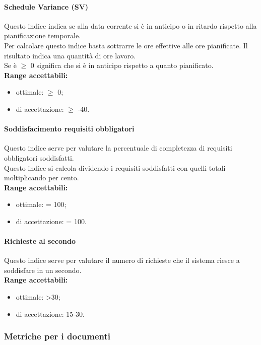 \documentclass{scalatekids-article}
\begin{document}
\paragraph{Schedule Variance (SV)}
Questo indice indica se alla data corrente si è in anticipo o in ritardo rispetto alla pianificazione temporale.\\ Per calcolare questo indice basta sottrarre le ore effettive alle ore pianificate. Il risultato indica una quantità di ore lavoro.\\
Se  è $\geq$ 0 significa che si è in anticipo rispetto a quanto pianificato.\\
\textbf{Range accettabili:}
\begin{itemize}
\item {} ottimale: $\geq$ 0;
\item {} di accettazione: $\geq$ -40.
\end{itemize}

\paragraph{Soddisfacimento requisiti obbligatori}
Questo indice serve per valutare la percentuale di completezza di requisiti obbligatori soddisfatti.\\Questo indice si calcola dividendo i requisiti soddisfatti con quelli totali moltiplicando per cento.\\
\textbf{Range accettabili:}
\begin{itemize}
\item {} ottimale: = 100;
\item {} di accettazione: = 100.
\end{itemize}

\paragraph{Richieste al secondo}
Questo indice serve per valutare il numero di richieste che il sistema riesce a soddisfare in un secondo.\\
\textbf{Range accettabili:}
\begin{itemize}
\item {} ottimale: >30;
\item {} di accettazione: 15-30.
\end{itemize}

\subsubsection{Metriche per i documenti}
\end{document}

